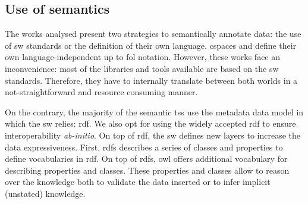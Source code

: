 \subsection{Use of semantics}

The works analysed present two strategies to semantically annotate data: the use of \ac{sw} standards or the definition of their own language.
\ac{cspaces} \citep{martinrecuerda_towards_2005} and \citet{nardini_semantic_2013} define their own language-independent up to \ac{fol} notation.
However, these works face an inconvenience: most of the libraries and tools available are based on the \ac{sw} standards. %
Therefore, they have to internally translate between both worlds in a not-straightforward and resource consuming manner. %




On the contrary, the majority of the semantic \acp{ts} use the metadata data model in which the \ac{sw} relies: \ac{rdf}. %
We also opt for using the widely accepted \ac{rdf} to ensure interoperability \emph{ab-initio}.
On top of \ac{rdf}, the \ac{sw} defines new layers to increase the data expressiveness.
First, \ac{rdfs}  describes a series of classes and properties to define vocabularies in \ac{rdf}.
On top of \ac{rdfs}, \ac{owl} offers additional vocabulary for describing properties and classes.
These properties and classes allow to reason over the knowledge both to validate the data inserted or to infer implicit (unstated) knowledge. %


